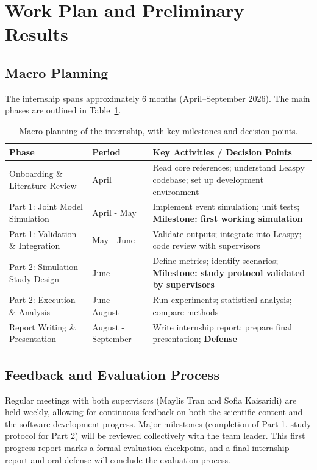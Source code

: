 \documentclass{rapportCS}
\begin{document}
\section{Work Plan and Preliminary Results}

\subsection{Macro Planning}

The internship spans approximately 6 months (April–September 2026). The main phases are outlined in Table~\ref{tab:planning}.

\begin{table}[h!]
\centering
\small
\begin{tabularx}{\textwidth}{|>{\raggedright\arraybackslash}X|>{\raggedright\arraybackslash}p{2.2cm}|>{\raggedright\arraybackslash}X|}
\hline
\textbf{Phase} & \textbf{Period} & \textbf{Key Activities / Decision Points} \\
\hline
Onboarding \& Literature Review & April & Read core references; understand Leaspy codebase; set up development environment \\
\hline
Part 1: Joint Model Simulation & April - May & Implement event simulation; unit tests; \textbf{Milestone: first working simulation} \\
\hline
Part 1: Validation \& Integration & May - June & Validate outputs; integrate into Leaspy; code review with supervisors \\
\hline
Part 2: Simulation Study Design & June & Define metrics; identify scenarios; \textbf{Milestone: study protocol validated by supervisors} \\
\hline
Part 2: Execution \& Analysis & June - August & Run experiments; statistical analysis; compare methods \\
\hline
Report Writing \& Presentation & August - September & Write internship report; prepare final presentation; \textbf{Defense} \\
\hline
\end{tabularx}
\caption{Macro planning of the internship, with key milestones and decision points.}
\label{tab:planning}
\end{table}

\subsection{Feedback and Evaluation Process}

Regular meetings with both supervisors (Maylis Tran and Sofia Kaisaridi) are held weekly, allowing for continuous feedback on both the scientific content and the software development progress. Major milestones (completion of Part 1, study protocol for Part 2) will be reviewed collectively with the team leader. This first progress report marks a formal evaluation checkpoint, and a final internship report and oral defense will conclude the evaluation process.
\end{document}
